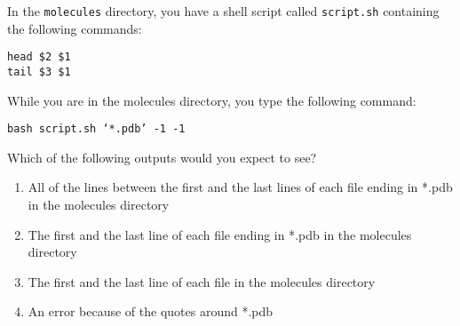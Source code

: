 \documentclass{beamer}
\begin{document}
\begin{frame}{}
In the \texttt{molecules} directory, you have a shell script called \texttt{script.sh} containing the following commands:
\begin{beamerboxesrounded}[upper=uppercolgreen,lower=lowercolgreen,shadow=false]{}
\small{\texttt{head \$2 \$1 \\ tail \$3 \$1}}
\end{beamerboxesrounded}

While you are in the molecules directory, you type the following command:

\begin{beamerboxesrounded}[upper=uppercolgreen,lower=lowercolgreen,shadow=false]{}
\small{\texttt{bash script.sh `*.pdb' -1 -1}}
\end{beamerboxesrounded}

Which of the following outputs would you expect to see?

\begin{enumerate}
\item{All of the lines between the first and the last lines of each file ending in *.pdb in the molecules directory}
    \item{The first and the last line of each file ending in *.pdb in the molecules directory}
    \item{The first and the last line of each file in the molecules directory}
    \item{An error because of the quotes around *.pdb}
\end{enumerate}


\end{frame}
\end{document}
